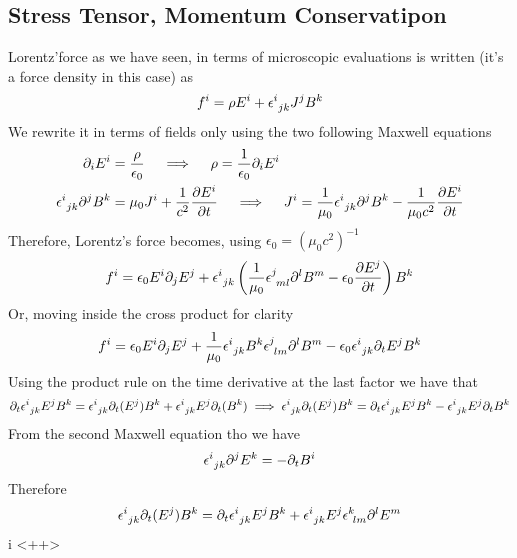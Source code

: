 \documentclass[../electromagnetism]{subfiles}
\begin{document}
\subsection{Stress Tensor, Momentum Conservatipon}
Lorentz'force as we have seen, in terms of microscopic evaluations is written (it's a force density in this case) as
\begin{equation}
	f^i=\rho E^i+\epsilon^{i}_{\ jk}J^jB^k
	\label{eq:lorentzforcedensity}
\end{equation}
We rewrite it in terms of fields only using the two following Maxwell equations
\begin{equation}
	\begin{aligned}
		\partial_iE^i&=\frac{\rho}{\epsilon_0}\quad\implies\quad\rho=\frac{1}{\epsilon_0}\partial_iE^i\\
		\epsilon^{i}_{\ jk}\partial^jB^k&=\mu_0J^i+\frac{1}{c^2}\pdv{E^i}{t}\quad\implies\quad J^i=\frac{1}{\mu_0}\epsilon^{i}_{\ jk}\partial^jB^k-\frac{1}{\mu_0c^2}\pdv{E^i}{t}
	\end{aligned}
	\label{eq:currentandchargeasfields}
\end{equation}
Therefore, Lorentz's force becomes, using $\epsilon_0=(\mu_0c^2)^{-1}$
\begin{equation*}
	f^i=\epsilon_0E^i\partial_jE^j+\epsilon^{i}_{\ jk}\left( \frac{1}{\mu_0}\epsilon^{j}_{\ ml}\partial^lB^m-\epsilon_0\pdv{E^j}{t} \right)B^k
\end{equation*}
Or, moving inside the cross product for clarity
\begin{equation*}
	f^i=\epsilon_0E^i\partial_jE^j+\frac{1}{\mu_0}\epsilon^{i}_{\ jk}B^k\epsilon^{j}_{\ lm}\partial^lB^m-\epsilon_0\epsilon^{i}_{\ jk}\partial_t{E^j}B^k
\end{equation*}
Using the product rule on the time derivative at the last factor we have that
\begin{equation*}
	\partial_t\epsilon^{i}_{\ jk}E^jB^k=\epsilon^{i}_{\ jk}\partial_t(E^j)B^k+\epsilon^{i}_{\ jk}E^j\partial_t(B^k)\implies\epsilon^{i}_{\ jk}\partial_t(E^j)B^k=\partial_t\epsilon^{i}_{\ jk}E^jB^k-\epsilon^{i}_{\ jk}E^j\partial_tB^k
\end{equation*}
From the second Maxwell equation tho we have
\begin{equation*}
	\epsilon^{i}_{\ jk}\partial^jE^k=-\partial_tB^i
\end{equation*}
Therefore
\begin{equation*}
	\epsilon^{i}_{\ jk}\partial_t(E^j)B^k=\partial_t\epsilon^{i}_{\ jk}E^jB^k+\epsilon^{i}_{\ jk}E^j\epsilon^{k}_{\ lm}\partial^lE^m
\end{equation*}i
<++>
\end{document}
